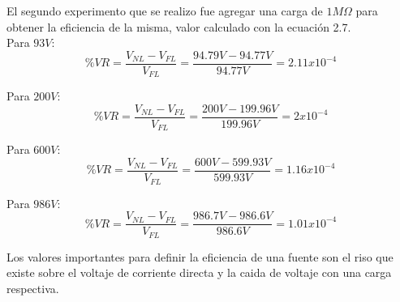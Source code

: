 El segundo experimento que se realizo fue agregar una carga de $1M\Omega$ para obtener la eficiencia de la misma, valor calculado con la ecuación 2.7. \\

Para $93V$: $$\%VR=\frac{V_{NL}-V_{FL}}{V_{FL}}=\frac{94.79V-94.77V}{94.77V}= 2.11x10^{-4}$$

Para $200V$: $$\%VR=\frac{V_{NL}-V_{FL}}{V_{FL}}=\frac{200V-199.96V}{199.96V}= 2x10^{-4}$$

Para $600V$: $$\%VR=\frac{V_{NL}-V_{FL}}{V_{FL}}=\frac{600V-599.93V}{599.93V}= 1.16x10^{-4}$$

Para $986V$: $$\%VR=\frac{V_{NL}-V_{FL}}{V_{FL}}=\frac{986.7V-986.6V}{986.6V}= 1.01x10^{-4}$$

Los valores importantes para definir la eficiencia de una fuente son el riso que existe sobre el voltaje de corriente directa y la caida de voltaje con una carga respectiva. 

